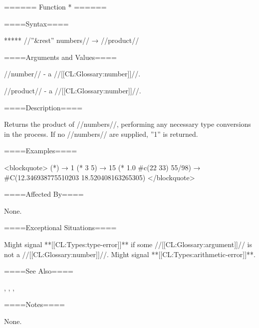 ====== Function * ======

====Syntax====

***** //''&rest'' numbers// → //product//

====Arguments and Values====

//number// - a //[[CL:Glossary:number]]//.

//product// - a //[[CL:Glossary:number]]//.

====Description====

Returns the product of //numbers//, performing any necessary type conversions in the process. If no //numbers// are supplied, ''1'' is returned.

====Examples====

<blockquote> (*) → 1 (* 3 5) → 15 (* 1.0 #c(22 33) 55/98) → #C(12.346938775510203 18.520408163265305) </blockquote>

====Affected By====

None.

====Exceptional Situations====

Might signal **[[CL:Types:type-error]]** if some //[[CL:Glossary:argument]]// is not a //[[CL:Glossary:number]]//. Might signal **[[CL:Types:arithmetic-error]]**.

====See Also====

{\secref\NumericOperations}, {\secref\RationalComputations}, {\secref\FloatingPointComputations}, {\secref\ComplexComputations}

====Notes====

None.

